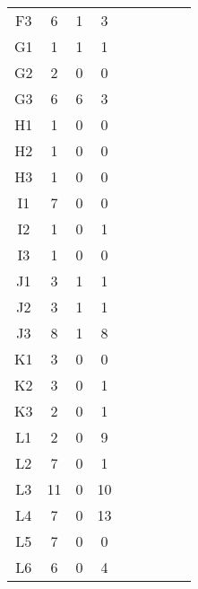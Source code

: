 \begin{center}
\begin{longtable}{ccccc|cccc}
    F3    & 6     & 1     & 3 \\
    G1    & 1     & 1     & 1 \\
    G2    & 2     & 0     & 0 \\
    G3    & 6     & 6     & 3 \\
    H1    & 1     & 0     & 0 \\
    H2    & 1     & 0     & 0 \\
    H3    & 1     & 0     & 0 \\
    I1    & 7     & 0     & 0 \\
    I2    & 1     & 0     & 1 \\
    I3    & 1     & 0     & 0 \\
    J1    & 3     & 1     & 1 \\
    J2    & 3     & 1     & 1 \\
    J3    & 8     & 1     & 8 \\
    K1    & 3     & 0     & 0 \\
    K2    & 3     & 0     & 1 \\
    K3    & 2     & 0     & 1 \\
    L1    & 2     & 0     & 9 \\
    L2    & 7     & 0     & 1 \\
    L3    & 11    & 0     & 10 \\
    L4    & 7     & 0     & 13 \\
    L5    & 7     & 0     & 0 \\
    L6    & 6     & 0     & 4 \\
\end{longtable}
\end{center}

